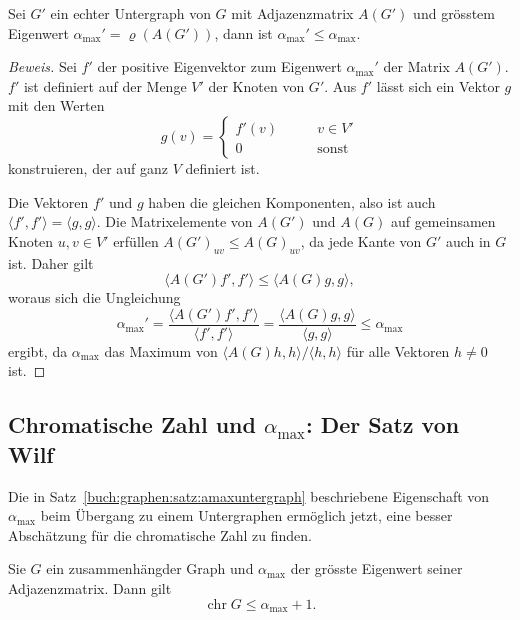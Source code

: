 \begin{satz}
\label{buch:graphen:satz:amaxuntergraph}
Sei $G'$ ein echter Untergraph von $G$ mit Adjazenzmatrix $A(G')$ und
grösstem Eigenwert $\alpha_{\text{max}}'=\varrho(A(G'))$, dann ist
$\alpha_{\text{max}}' \le \alpha_{\text{max}}$.
\end{satz}

\begin{proof}[Beweis]
Sei $f'$ der positive Eigenvektor zum Eigenwert $\alpha_{\text{max}}'$
der Matrix $A(G')$.
$f'$ ist definiert auf der Menge $V'$ der Knoten von $G'$.
Aus $f'$ lässt sich ein Vektor $g$ mit den Werten
\[
g(v)
=
\begin{cases}
f'(v)&\qquad v\in V'\\
    0&\qquad\text{sonst}
\end{cases}
\]
konstruieren, der auf ganz $V$ definiert ist.

Die Vektoren $f'$ und $g$ haben die gleichen Komponenten, also ist auch
$\langle f',f'\rangle = \langle g,g\rangle$.
Die Matrixelemente von $A(G')$ und $A(G)$ auf gemeinsamen Knoten $u,v\in V'$ 
erfüllen $A(G')_{uv}\le A(G)_{uv}$, da jede Kante von $G'$ auch in $G$ ist.
Daher gilt
\[
\langle A(G')f',f'\rangle
\le
\langle A(G)g,g\rangle,
\]
woraus sich die Ungleichung
\[
\alpha_{\text{max}}'
=
\frac{\langle A(G')f',f'\rangle}{\langle f',f'\rangle}
=
\frac{\langle A(G)g,g\rangle}{\langle g,g\rangle}
\le
\alpha_{\text{max}}
\]
ergibt, da $\alpha_{\text{max}}$ das Maximum von
$\langle A(G)h,h\rangle/\langle h,h\rangle$ für alle Vektoren $h\ne 0$ ist.
\end{proof}

%
%
\subsection{Chromatische Zahl und $\alpha_{\text{max}}$: Der Satz von Wilf
\label{buch:subsection:chr-und-alpha-max}}
Die in Satz~\ref{buch:graphen:satz:amaxuntergraph} beschriebene
Eigenschaft von $\alpha_{\text{max}}$ beim Übergang zu einem Untergraphen
ermöglich jetzt, eine besser Abschätzung für die chromatische Zahl
zu finden.

\begin{satz}[Wilf]
\label{buch:graphen:satz:wilf}
Sie $G$ ein zusammenhängder Graph und $\alpha_{\text{max}}$ der grösste
Eigenwert seiner Adjazenzmatrix. Dann gilt
\[
\operatorname{chr}G\le \alpha_{\text{max}}+1.
\]
\end{satz}

